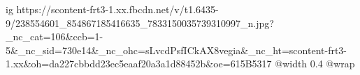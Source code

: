  
 
 
 
 

\ifcmt
  ig https://scontent-frt3-1.xx.fbcdn.net/v/t1.6435-9/238554601_854867185416635_7833150035739310997_n.jpg?_nc_cat=106&ccb=1-5&_nc_sid=730e14&_nc_ohc=sLvcdPsfICkAX8vegia&_nc_ht=scontent-frt3-1.xx&oh=da227cbbdd23ec5eaaf20a3a1d88452b&oe=615B5317
  @width 0.4
  @wrap \parpic[r]
\fi

